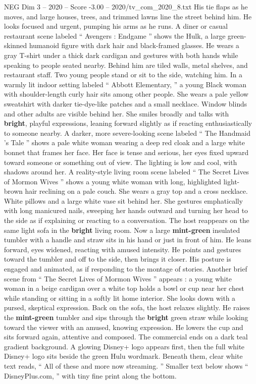 \begin{textsample}{NEG Dim 3 – 2020 – Score -3.00 – 2020/tv\_com\_2020\_8.txt}
His tie flaps as he moves, and large houses, trees, and trimmed lawns line the street behind him.
He looks focused and urgent, pumping his arms as he runs.
A diner or casual restaurant scene labeled “ Avengers : Endgame ” shows the Hulk, a large green-skinned humanoid figure with dark hair and black-framed glasses.
He wears a gray T-shirt under a thick dark cardigan and gestures with both hands while speaking to people seated nearby.
Behind him are tiled walls, metal shelves, and restaurant staff.
Two young people stand or sit to the side, watching him.
In a warmly lit indoor setting labeled “ Abbott Elementary, ” a young Black woman with shoulder-length curly hair sits among other people.
She wears a pale yellow sweatshirt with darker tie-dye-like patches and a small necklace.
Window blinds and other adults are visible behind her.
She smiles broadly and talks with \textbf{bright}, playful expressions, leaning forward slightly as if reacting enthusiastically to someone nearby.
A darker, more severe-looking scene labeled “ The Handmaid ’s Tale ” shows a pale white woman wearing a deep red cloak and a large white bonnet that frames her face.
Her face is tense and serious, her eyes fixed upward toward someone or something out of view.
The lighting is low and cool, with shadows around her.
A reality-style living room scene labeled “ The Secret Lives of Mormon Wives ” shows a young white woman with long, highlighted light-brown hair reclining on a pale couch.
She wears a gray top and a cross necklace.
White pillows and a large white vase sit behind her.
She gestures emphatically with long manicured nails, sweeping her hands outward and turning her head to the side as if explaining or reacting to a conversation.
The host reappears on the same light sofa in the \textbf{bright} living room.
Now a large \textbf{mint-green} insulated tumbler with a handle and straw sits in his hand or just in front of him.
He leans forward, eyes widened, reacting with amused intensity.
He points and gestures toward the tumbler and off to the side, then brings it closer.
His posture is engaged and animated, as if responding to the montage of stories.
Another brief scene from “ The Secret Lives of Mormon Wives ” appears : a young white woman in a beige cardigan over a white top holds a bowl or cup near her chest while standing or sitting in a softly lit home interior.
She looks down with a pursed, skeptical expression.
Back on the sofa, the host relaxes slightly.
He raises the \textbf{mint-green} tumbler and sips through the \textbf{bright} green straw while looking toward the viewer with an amused, knowing expression.
He lowers the cup and sits forward again, attentive and composed.
The commercial ends on a dark teal gradient background.
A glowing Disney+ logo appears first, then the full white Disney+ logo sits beside the green Hulu wordmark.
Beneath them, clear white text reads, “ All of these and more now streaming. ” Smaller text below shows “ DisneyPlus.com, ” with tiny fine print along the bottom.

\end{textsample}
